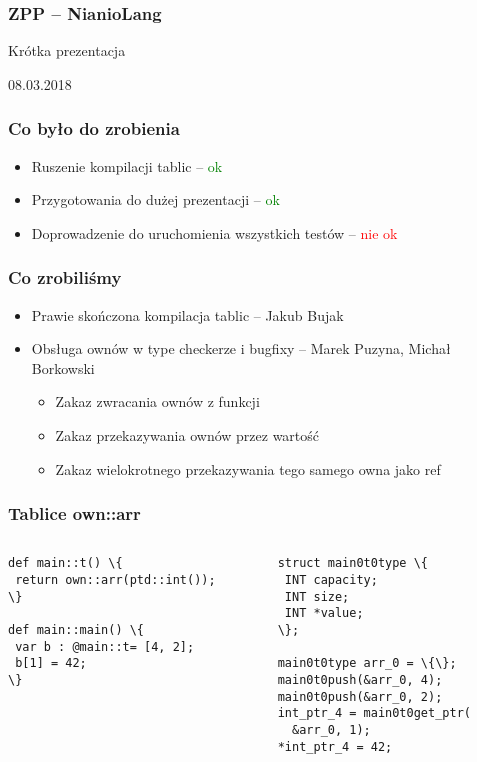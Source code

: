 \documentclass{beamer}
\begin{document}
	\begin{frame}
		\frametitle{ZPP -- NianioLang}
		Krótka prezentacja
		
		08.03.2018
	\end{frame}
	
	\begin{frame}
		\frametitle{Co było do zrobienia}
		\begin{itemize}
			\item Ruszenie kompilacji tablic -- \textcolor{green}{ok}
			\item Przygotowania do dużej prezentacji -- \textcolor{green}{ok}
			\item Doprowadzenie do uruchomienia wszystkich testów -- \textcolor{red}{nie ok}
		\end{itemize}
	\end{frame}
	
	\begin{frame}
		\frametitle{Co zrobiliśmy}
		\begin{itemize}
			\item Prawie skończona kompilacja tablic -- Jakub Bujak
			\item Obsługa ownów w type checkerze i bugfixy -- Marek Puzyna, Michał Borkowski
			\begin{itemize}
				\item Zakaz zwracania ownów z funkcji
				\item Zakaz przekazywania ownów przez wartość
				\item Zakaz wielokrotnego przekazywania tego samego owna jako ref
			\end{itemize}

		\end{itemize}
	\end{frame}
	
	\begin{frame}[fragile]
		\frametitle{Tablice own::arr}
		\begin{columns}
			\begin{column}{0.5\textwidth}
				\begin{Verbatim}[commandchars=\\\{\}]
def main::t() \{
 return own::arr(ptd::int());
\}

def main::main() \{
 var b : @main::t= [4, 2];
 b[1] = 42;
\}
				\end{Verbatim}
			\end{column}
			\begin{column}{0.5\textwidth}  %
				\begin{Verbatim}[commandchars=\\\{\}]
struct main0t0type \{
 INT capacity;
 INT size;
 INT *value;
\};

main0t0type arr_0 = \{\};
main0t0push(&arr_0, 4);
main0t0push(&arr_0, 2);
int_ptr_4 = main0t0get_ptr(
  &arr_0, 1);
*int_ptr_4 = 42;
				\end{Verbatim}
			\end{column}
		\end{columns}
	\end{frame}
	
\end{document}
